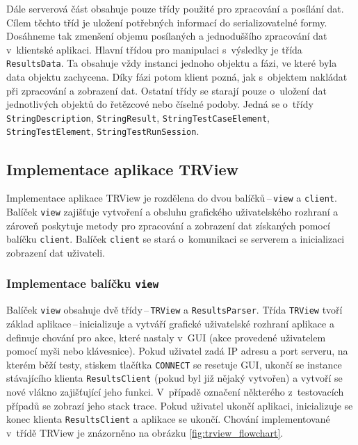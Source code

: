 	Dále serverová část obsahuje pouze třídy použité pro zpracování a posílání dat. Cílem těchto tříd je uložení potřebných informací do serializovatelné formy. Dosáhneme tak zmenšení objemu posílaných a jednoduššího zpracování dat v~klientské aplikaci. Hlavní třídou pro manipulaci s~výsledky je třída \texttt{ResultsData}. Ta obsahuje vždy instanci jednoho objektu a fázi, ve které byla data objektu zachycena. Díky fázi potom klient pozná, jak s~objektem nakládat při zpracování a zobrazení dat. Ostatní třídy se starají pouze o~uložení dat jednotlivých objektů do řetězcové nebo číselné podoby. Jedná se o~třídy \texttt{StringDescription}, \texttt{StringResult}, \texttt{StringTestCaseElement}, \texttt{StringTestElement}, \texttt{StringTestRunSession}.

    \subsection{Implementace aplikace TRView}
    Implementace aplikace TRView je rozdělena do dvou balíčků\,--\,\texttt{view} a \texttt{client}. Balíček \texttt{view} zajišťuje vytvoření a obsluhu grafického uživatelského rozhraní a zároveň poskytuje metody pro zpracování a zobrazení dat získaných pomocí balíčku \texttt{client}. Balíček \texttt{client} se stará o~komunikaci se serverem a inicializaci zobrazení dat uživateli. 
    
      \subsubsection{Implementace balíčku \texttt{view}}
      Balíček \texttt{view} obsahuje dvě třídy\,--\,\texttt{TRView} a \texttt{ResultsParser}. Třída \texttt{TRView} tvoří základ aplikace\,--\,inicializuje a vytváří grafické uživatelské rozhraní aplikace a definuje chování pro akce, které nastaly v~GUI (akce provedené uživatelem pomocí myši nebo klávesnice). Pokud uživatel zadá IP adresu a port serveru, na kterém běží testy, stiskem tlačítka \texttt{CONNECT} se resetuje GUI, ukončí se instance stávajícího klienta \texttt{ResultsClient} (pokud byl již nějaký vytvořen) a vytvoří se nové vlákno zajišťující jeho funkci. V~případě označení některého z~testovacích případů se zobrazí jeho stack trace. Pokud uživatel ukončí aplikaci, inicializuje se konec klienta \texttt{ResultsClient} a aplikace se ukončí. Chování implementované v~třídě TRView je znázorněno na obrázku \ref{fig:trview_flowchart}.

